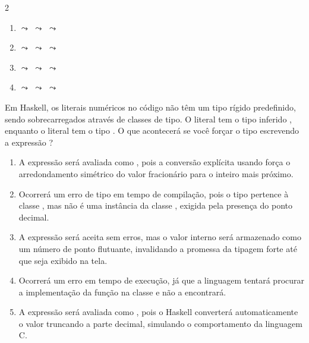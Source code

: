 \documentclass[a4paper,10pt,brazil]{article}
\begin{document}
\begin{multicols}{2}
\begin{enumerate}
  \item {} $\leadsto$  $\leadsto$  $\leadsto$ 

  \item {} $\leadsto$  $\leadsto$  $\leadsto$ 

  \item {} $\leadsto$  $\leadsto$  $\leadsto$ 

  \item {} $\leadsto$  $\leadsto$  $\leadsto$ 


\end{enumerate}

Em Haskell, os literais numéricos no código não têm um tipo rígido predefinido, sendo sobrecarregados através de classes de tipo. O literal  tem o tipo inferido , enquanto o literal  tem o tipo . 
O que acontecerá se você forçar o tipo escrevendo a expressão ?

\begin{enumerate}
  \item A expressão será avaliada como , pois a conversão explícita usando \haskellinline{::} força o arredondamento simétrico do valor fracionário para o inteiro mais próximo.

  \item Ocorrerá um erro de tipo em tempo de compilação, pois o tipo  pertence à classe , mas não é uma instância da classe , exigida pela presença do ponto decimal.

  \item A expressão será aceita sem erros, mas o valor interno será armazenado como um número de ponto flutuante, invalidando a promessa da tipagem forte até que seja exibido na tela.

  \item Ocorrerá um erro em tempo de execução, já que a linguagem tentará procurar a implementação da função  na classe  e não a encontrará.

  \item A expressão será avaliada como , pois o Haskell converterá automaticamente o valor truncando a parte decimal, simulando o comportamento da linguagem C.



\end{enumerate}
\end{multicols}
\end{document}
